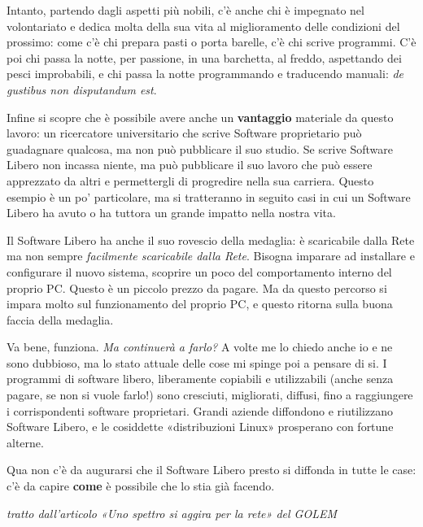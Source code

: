 \documentclass[a4paper, 12pt]{extarticle}
\begin{document}
\vspace{1em}

Intanto, partendo dagli aspetti più nobili, c'è anche chi è impegnato
nel volontariato e dedica molta della sua vita al miglioramento delle
condizioni del prossimo: come c'è chi prepara pasti o porta barelle,
c'è chi scrive programmi. C'è poi chi passa la notte, per passione, in
una barchetta, al freddo, aspettando dei pesci improbabili, e chi passa
la notte programmando e traducendo manuali: \textit{de gustibus non
disputandum est}.

Infine si scopre che è possibile avere anche un \textbf{vantaggio}
materiale da questo lavoro: un ricercatore universitario che scrive
Software proprietario può guadagnare qualcosa, ma non può pubblicare il
suo studio. Se scrive Software Libero non incassa niente, ma può
pubblicare il suo lavoro che può essere apprezzato da altri e
permettergli di progredire nella sua carriera. Questo esempio è un po'
particolare, ma si tratteranno in seguito casi in cui un Software
Libero ha avuto o ha tuttora un grande impatto nella nostra vita.

Il Software Libero ha anche il suo rovescio della medaglia: è
scaricabile dalla Rete ma non sempre \textit{facilmente scaricabile
dalla Rete}. Bisogna imparare ad installare e configurare il nuovo
sistema, scoprire un poco del comportamento interno del proprio PC.
Questo è un piccolo prezzo da pagare. Ma da questo percorso si impara
molto sul funzionamento del proprio PC, e questo ritorna sulla buona
faccia della medaglia.

Va bene, funziona. \textit{Ma continuerà a farlo?} A volte me lo chiedo
anche io e ne sono dubbioso, ma lo stato attuale delle cose mi spinge
poi a pensare di si. I programmi di software libero, liberamente
copiabili e utilizzabili (anche senza pagare, se non si vuole farlo!)
sono cresciuti, migliorati, diffusi, fino a raggiungere i
corrispondenti software proprietari. Grandi aziende diffondono e
riutilizzano Software Libero, e le cosiddette «distribuzioni Linux»
prosperano con fortune alterne.

Qua non c'è da augurarsi che il Software Libero presto si diffonda in
tutte le case: c'è da capire \textbf{come} è possibile che lo stia già
facendo.

\begin{center}
\textit{tratto dall'articolo «Uno spettro si aggira per la rete» del GOLEM}
\end{center}

\clearpage{}
\end{document}
